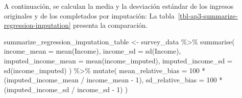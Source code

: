 \documentclass[
  spanish,
  11pt,
  letterpaper,
  oneside,
  open=any]{scrbook}
\newenvironment{Shaded}{\begin{snugshade}}{\end{snugshade}}
\newcommand{\AttributeTok}[1]{\textcolor[rgb]{0.40,0.45,0.13}{#1}}
\newcommand{\DecValTok}[1]{\textcolor[rgb]{0.68,0.00,0.00}{#1}}
\newcommand{\FunctionTok}[1]{\textcolor[rgb]{0.28,0.35,0.67}{#1}}
\newcommand{\NormalTok}[1]{\textcolor[rgb]{0.00,0.23,0.31}{#1}}
\newcommand{\OtherTok}[1]{\textcolor[rgb]{0.00,0.23,0.31}{#1}}
\newcommand{\SpecialCharTok}[1]{\textcolor[rgb]{0.37,0.37,0.37}{#1}}
\begin{document}
A continuación, se calculan la media y la desviación estándar de los
ingresos originales y de los completados por imputación: La
tabla~\ref{tbl-ap3-summarize-regression-imputation} presenta la
comparación.

\begin{Shaded}
\begin{Highlighting}[]
\NormalTok{summarize\_regression\_imputation\_table }\OtherTok{\textless{}{-}}\NormalTok{ survey\_data }\SpecialCharTok{\%\textgreater{}\%}
  \FunctionTok{summarise}\NormalTok{(}
    \AttributeTok{income\_mean =} \FunctionTok{mean}\NormalTok{(Income),}
    \AttributeTok{income\_sd =} \FunctionTok{sd}\NormalTok{(Income),}
    \AttributeTok{imputed\_income\_mean =} \FunctionTok{mean}\NormalTok{(income\_imputed),}
    \AttributeTok{imputed\_income\_sd =} \FunctionTok{sd}\NormalTok{(income\_imputed)}
\NormalTok{  ) }\SpecialCharTok{\%\textgreater{}\%}
  \FunctionTok{mutate}\NormalTok{(}
    \AttributeTok{mean\_relative\_bias =} \DecValTok{100} \SpecialCharTok{*}\NormalTok{ (imputed\_income\_mean }\SpecialCharTok{/}\NormalTok{ income\_mean }\SpecialCharTok{{-}} \DecValTok{1}\NormalTok{),}
    \AttributeTok{sd\_relative\_bias =} \DecValTok{100} \SpecialCharTok{*}\NormalTok{ (imputed\_income\_sd }\SpecialCharTok{/}\NormalTok{ income\_sd }\SpecialCharTok{{-}} \DecValTok{1}\NormalTok{)}
\NormalTok{  )}
\end{Highlighting}
\end{Shaded}
\end{document}
